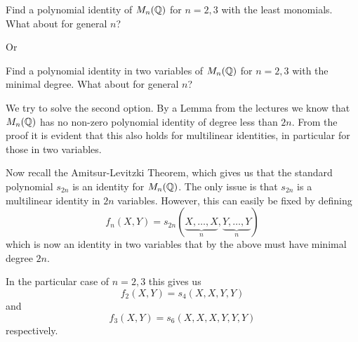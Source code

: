 \documentclass[a4paper, 12pt]{article}
\begin{document}
\begin{Exercise}
    Find a polynomial identity of $M_n(\mathbb{Q})$ for $n = 2, 3$ with the least monomials.
    What about for general $n$?

    Or

    Find a polynomial identity in two variables of $M_n(\mathbb{Q})$ for $n = 2, 3$ with the minimal degree.
    What about for general $n$?

    We try to solve the second option.
    By a Lemma from the lectures we know that $M_n(\mathbb{Q})$ has no non-zero polynomial identity of degree less than $2n$.
    From the proof it is evident that this also holds for multilinear identities, in particular for those in two variables.

    Now recall the Amitsur-Levitzki Theorem, which gives us that the standard polynomial $s_{2n}$ is an identity for $M_n(\mathbb{Q})$.
    The only issue is that $s_{2n}$ is a multilinear identity in $2n$ variables.
    However, this can easily be fixed by defining
    \[
        f_n(X, Y) = s_{2n}(\underbrace{X, \dots, X}_n, \underbrace{Y, \dots, Y}_n) 
    \]
    which is now an identity in two variables that by the above must have minimal degree $2n$.

    In the particular case of $n = 2, 3$ this gives us
    \[
        f_2(X, Y) = s_4(X, X, Y, Y)
    \]
    and
    \[
        f_3(X, Y) = s_6(X, X, X, Y, Y, Y)
    \]
    respectively.



\end{Exercise}
\end{document}
